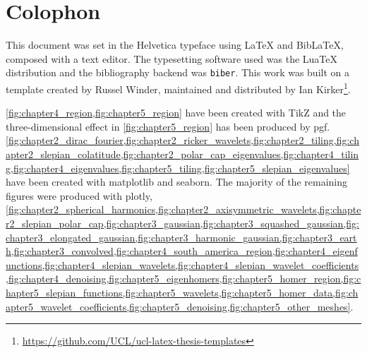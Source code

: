\appendix

\chapter{Colophon}\label{sec:appendix}

This document was set in the Helvetica typeface using \LaTeX{} and Bib\LaTeX{}, composed with a text editor.
The typesetting software used was the Lua\TeX{} distribution and the bibliography backend was \texttt{biber}.
This work was built on a template created by Russel Winder, maintained and distributed by Ian Kirker\footnote{\url{https://github.com/UCL/ucl-latex-thesis-templates}}.

\cref{fig:chapter4_region,fig:chapter5_region} have been created with TikZ and the three-dimensional effect in \cref{fig:chapter5_region} has been produced by pgf.
\cref{fig:chapter2_dirac_fourier,fig:chapter2_ricker_wavelets,fig:chapter2_tiling,fig:chapter2_slepian_colatitude,fig:chapter2_polar_cap_eigenvalues,fig:chapter4_tiling,fig:chapter4_eigenvalues,fig:chapter5_tiling,fig:chapter5_slepian_eigenvalues} have been created with matplotlib and seaborn.
The majority of the remaining figures were produced with plotly, \ie{} \cref{fig:chapter2_spherical_harmonics,fig:chapter2_axisymmetric_wavelets,fig:chapter2_slepian_polar_cap,fig:chapter3_gaussian,fig:chapter3_squashed_gaussian,fig:chapter3_elongated_gaussian,fig:chapter3_harmonic_gaussian,fig:chapter3_earth,fig:chapter3_convolved,fig:chapter4_south_america_region,fig:chapter4_eigenfunctions,fig:chapter4_slepian_wavelets,fig:chapter4_slepian_wavelet_coefficients,fig:chapter4_denoising,fig:chapter5_eigenhomers,fig:chapter5_homer_region,fig:chapter5_slepian_functions,fig:chapter5_wavelets,fig:chapter5_homer_data,fig:chapter5_wavelet_coefficients,fig:chapter5_denoising,fig:chapter5_other_meshes}.


